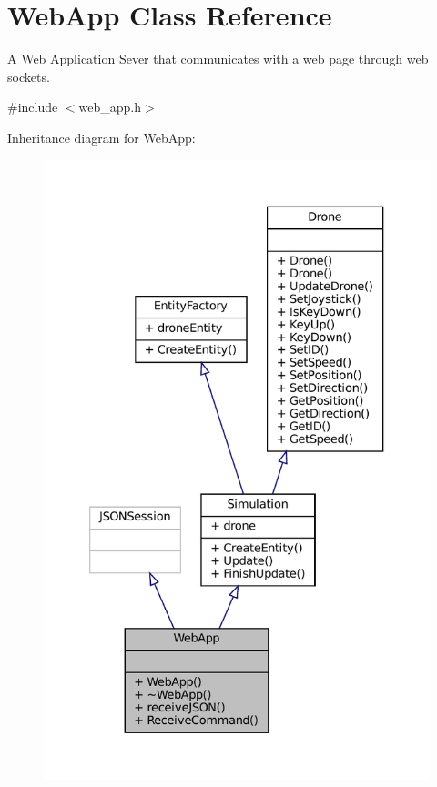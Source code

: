 \hypertarget{classWebApp}{}\section{Web\+App Class Reference}
\label{classWebApp}


A Web Application Sever that communicates with a web page through web sockets.  




{\ttfamily \#include $<$web\+\_\+app.\+h$>$}



Inheritance diagram for Web\+App\+:\nopagebreak
\begin{figure}[H]
\begin{center}
\leavevmode
\includegraphics[width=333pt]{classWebApp__inherit__graph}
\end{center}
\end{figure}


